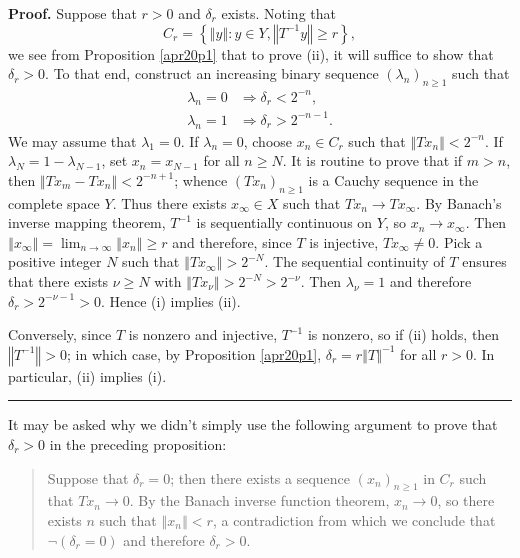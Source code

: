 \documentclass[11pt]{article}%
\newenvironment{proof}[1][Proof]{\noindent\textbf{#1.} }{\ \rule{0.5em}{0.5em}}
\begin{document}
\begin{proof}
Suppose that $r>0$ and $\delta_{r}$ exists. Noting that%
\[
C_{r}=\left\{  \left\Vert y\right\Vert :y\in Y,\left\Vert T^{-1}y\right\Vert
\geq r\right\}  ,
\]
we see from Proposition \ref{apr20p1} that to prove (ii), it will suffice to
show that $\delta_{r}>0$. To that end, construct an increasing binary sequence
$\left(  \lambda_{n}\right)  _{n\geq1}$ such that%
\begin{align*}
\lambda_{n}=0  &  \Rightarrow\delta_{r}<2^{-n},\\
\lambda_{n}=1  &  \Rightarrow\delta_{r}>2^{-n-1}.
\end{align*}
We may assume that $\lambda_{1}=0$. If $\lambda_{n}=0$, choose $x_{n}\in
C_{r}$ such that $\left\Vert Tx_{n}\right\Vert <2^{-n}$. If $\lambda
_{N}=1-\lambda_{N-1}$, set $x_{n}=x_{N-1}$ for all $n\geq N$. It is routine to
prove that if $m>n$, then $\left\Vert Tx_{m}-Tx_{n}\right\Vert <2^{-n+1}$;
whence $\left(  Tx_{n}\right)  _{n\geq1}$ is a Cauchy sequence in the complete
space $Y$. Thus there exists $x_{\infty}\in X$ such that $Tx_{n}\rightarrow
Tx_{\infty}$. By Banach's inverse mapping theorem, $T^{-1} $ is sequentially
continuous on $Y$, so $x_{n}\rightarrow x_{\infty}$. Then $\left\Vert
x_{\infty}\right\Vert =\lim_{n\rightarrow\infty}\left\Vert x_{n}\right\Vert
\geq r$ and therefore, since $T$ is injective, $Tx_{\infty}\neq0$. Pick a
positive integer $N$ such that $\left\Vert Tx_{\infty}\right\Vert >2^{-N}$.
The sequential continuity of $T$ ensures that there exists $\nu\geq N$ with
$\left\Vert Tx_{\nu}\right\Vert >2^{-N}>2^{-\nu}$. Then $\lambda_{\nu}=1$ and
therefore $\delta_{r}>2^{-\nu-1}>0$. Hence (i) implies (ii).

Conversely, since $T$ is nonzero and injective, $T^{-1}$ is nonzero, so if
(ii) holds, then $\left\Vert T^{-1}\right\Vert >0$; in which case, by
Proposition \ref{apr20p1}, $\delta_{r}=r\left\Vert T\right\Vert ^{-1}$ for all
$r>0$. In particular, (ii) implies (i).
\end{proof}

%

\medskip


It may be asked why we didn't simply use the following argument to prove that
$\delta_{r}>0$ in the preceding proposition:

\begin{quote}
Suppose that $\delta_{r}=0$; then there exists a sequence $\left(
x_{n}\right)  _{n\geq1}$ in $C_{r}$ such that $Tx_{n}\rightarrow0$. By the
Banach inverse function theorem, $x_{n}\rightarrow0$, so there exists $n$ such
that $\left\Vert x_{n}\right\Vert <r$, a contradiction from which we conclude
that $\lnot(\delta_{r}=0)$ and therefore $\delta_{r}>0$.
\end{quote}
\end{document}
